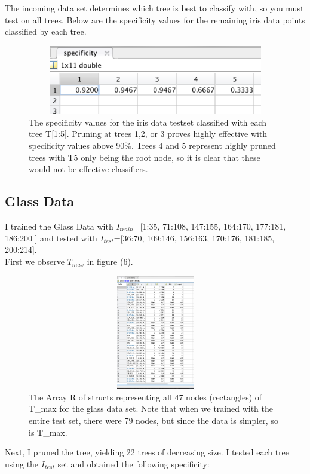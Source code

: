 \documentclass{article}
\begin{document}
The incoming data set determines which tree is best to classify with, so you must test on all trees.  Below are the specificity values for the remaining iris data points classified by each tree. 
\begin{figure}[H]
    \centerline
    {\includegraphics[width=12cm, height=3cm]{IrisData_specificity.png}
    }
    \caption{\label{fig:my figure}The specificity values for the iris data testset classified with each tree T[1:5].  Pruning at trees 1,2, or 3 proves highly effective with specificity values above 90\%.  Trees 4 and 5 represent highly pruned trees with T{5} only being the root node, so it is clear that these would not be effective classifiers.   }
\end{figure}

\subsection*{Glass Data}
I trained the Glass Data with $I_{train}$=[1:35, 71:108, 147:155, 164:170, 177:181, 186:200 ] and tested with $I_{test}$=[36:70, 109:146, 156:163, 170:176, 181:185, 200:214].
\\First we observe $T_{max}$ in figure (6).
\begin{figure}[H]
    \centerline
    {\includegraphics[width=12cm, height=5cm]{GlassData_test_max.png}
    }
    \caption{\label{fig:my figure}The Array R of structs representing all 47 nodes (rectangles) of T\_max for the glass data set. Note that when we trained with the entire test set, there were 79 nodes, but since the data is simpler, so is T\_max.   }
\end{figure}

Next, I pruned the tree, yielding 22 trees of decreasing size.  I tested each tree using the $I_{test}$ set and obtained the following specificity:
\end{document}
